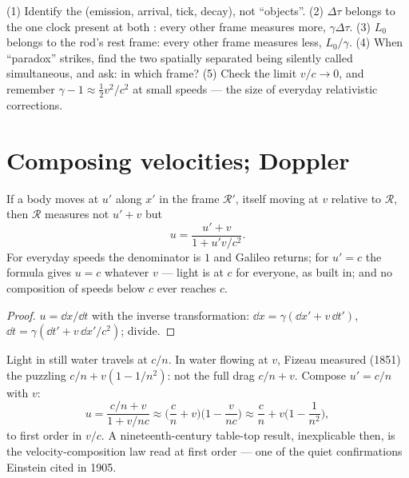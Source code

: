 \begin{method}\label{met:b3:relativistic-kinematics:method}
(1) Identify the \emph{} (emission, arrival, tick, decay), not
``objects''. (2)  $\Delta\tau$ belongs to the one clock
present at both : every other frame measures more,
$\gamma\Delta\tau$. (3)  $L_0$ belongs to the rod's rest
frame: every other frame measures less, $L_0/\gamma$. (4) When
``paradox'' strikes, find the two spatially separated  being
silently called simultaneous, and ask: in which frame? (5) Check the
limit $v/c \to 0$, and remember $\gamma - 1 \approx \tfrac12 v^2/c^2$
at small speeds --- the size of everyday relativistic corrections.
\end{method}

\section{Composing velocities; Doppler}

\begin{proposition}\label{prop:b3:relativistic-kinematics:addition}
If a body moves at $u'$ along $x'$ in the frame $\mathcal R'$, itself
moving at $v$ relative to $\mathcal R$, then $\mathcal R$ measures not
$u' + v$ but
\[
u = \frac{u' + v}{1 + u'v/c^2} .
\]
For everyday speeds the denominator is $1$ and Galileo returns; for
$u' = c$ the formula gives $u = c$ whatever $v$ --- light is at $c$
for everyone, as built in; and no composition of speeds below $c$ ever
reaches $c$.
\end{proposition}

\begin{proof}
$u = \dd x/\dd t$ with the inverse transformation: $\dd x =
\gamma(\dd x' + v\,\dd t')$, $\dd t = \gamma(\dd t' + v\,\dd x'/c^2)$;
divide.
\end{proof}

\begin{example}\label{ex:b3:relativistic-kinematics:fizeau}
Light in still water travels at $c/n$. In water flowing at $v$, Fizeau
measured (1851) the puzzling $c/n + v(1 - 1/n^2)$: not the full drag
$c/n + v$. Compose $u' = c/n$ with $v$:
\[
u = \frac{c/n + v}{1 + v/nc}
\approx \Big(\frac{c}{n} + v\Big)\Big(1 - \frac{v}{nc}\Big)
\approx \frac{c}{n} + v\Big(1 - \frac{1}{n^2}\Big) ,
\]
to first order in $v/c$. A nineteenth-century table-top result,
inexplicable then, is the velocity-composition law read at first
order --- one of the quiet confirmations Einstein cited in 1905.
\end{example}

